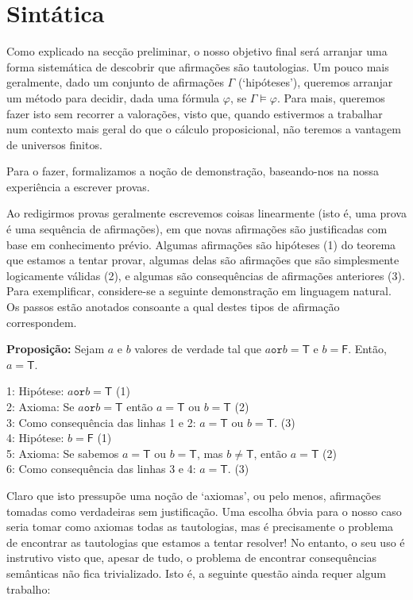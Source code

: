 \documentclass{report}
\theoremstyle{definition}
\theoremstyle{remark}
\newcommand{\lt}{\mathsf{T}}
\newcommand{\lf}{\mathsf{F}}
\newcommand{\por}{\mathbin{\texttt{or}}}
\begin{document}
	\section{Sintática}
	
	Como explicado na secção preliminar, o nosso objetivo final será arranjar uma forma sistemática de descobrir que afirmações são tautologias. Um pouco mais geralmente, dado um conjunto de afirmações $\Gamma$ (`hipóteses'), queremos arranjar um método para decidir, dada uma fórmula $\varphi$, se $\Gamma \vDash \varphi$. Para mais, queremos fazer isto sem recorrer a valorações, visto que, quando estivermos a trabalhar num contexto mais geral do que o cálculo proposicional, não teremos a vantagem de universos finitos.
	
	Para o fazer, formalizamos a noção de demonstração, baseando-nos na nossa experiência a escrever provas.
	
	Ao redigirmos provas geralmente escrevemos coisas linearmente (isto é, uma prova é uma sequência de afirmações), em que novas afirmações são justificadas com base em conhecimento prévio. Algumas afirmações são hipóteses (1) do teorema que estamos a tentar provar, algumas delas são afirmações que são simplesmente logicamente válidas (2), e algumas são consequências de afirmações anteriores (3). Para exemplificar, considere-se a seguinte demonstração em linguagem natural. Os passos estão anotados consoante a qual destes tipos de afirmação correspondem.
	
	\medskip
	
	\textbf{Proposição:} Sejam $a$ e $b$ valores de verdade tal que $a \por b = \lt$ e $b = \lf$. Então, $a = \lt$.
	
	\begin{adjustwidth}{1cm}{}
	1: Hipótese: $a \por b = \lt$ (1)\\
	2: Axioma: Se $a \por b = \lt$ então $a = \lt$ ou $b = \lt$ (2)\\
	3: Como consequência das linhas 1 e 2: $a = \lt$ ou $b = \lt$. (3)\\
	4: Hipótese: $b = \lf$ (1)\\
	5: Axioma: Se sabemos $a = \lt$ ou $b = \lt$, mas $b \neq \lt$, então $a = \lt$ (2)\\
	6: Como consequência das linhas 3 e 4: $a = \lt$. (3)
	\end{adjustwidth}
	
	\medskip
	
	Claro que isto pressupõe uma noção de `axiomas', ou pelo menos, afirmações tomadas como verdadeiras sem justificação. Uma escolha óbvia para o nosso caso seria tomar como axiomas todas as tautologias, mas é precisamente o problema de encontrar as tautologias que estamos a tentar resolver! No entanto, o seu uso é instrutivo visto que, apesar de tudo, o problema de encontrar consequências semânticas não fica trivializado. Isto é, a seguinte questão ainda requer algum trabalho:
	
\end{document}
